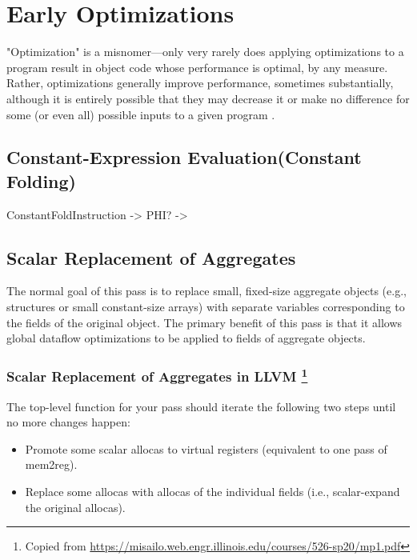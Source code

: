 \newpage 


\section{Early Optimizations}

"Optimization" is a misnomer—only very rarely
does applying optimizations to a program result in object code whose performance
is optimal, by any measure. Rather, optimizations generally improve performance,
sometimes substantially, although it is entirely possible that they may decrease it or
make no difference for some (or even all) possible inputs to a given program .



\subsection{Constant-Expression Evaluation(Constant Folding)}




ConstantFoldInstruction -> PHI?
                        -> 





\subsection{Scalar Replacement of Aggregates}


The normal goal of this pass is to replace small, fixed-size aggregate objects (e.g., structures or small
constant-size arrays) with separate variables corresponding to the fields of the original object. The primary benefit
of this pass is that it allows global dataflow optimizations to be applied to fields of aggregate objects.



\subsubsection{Scalar Replacement of Aggregates in LLVM \footnote{Copied from \url{https://misailo.web.engr.illinois.edu/courses/526-sp20/mp1.pdf}}}



The top-level function for your pass should iterate the following two steps until no more changes happen:

\begin{itemize}

    \item Promote some scalar allocas to virtual registers (equivalent to one pass of mem2reg).
    \item Replace some allocas with allocas of the individual fields (i.e., scalar-expand the original allocas).
    
    
\end{itemize}    


